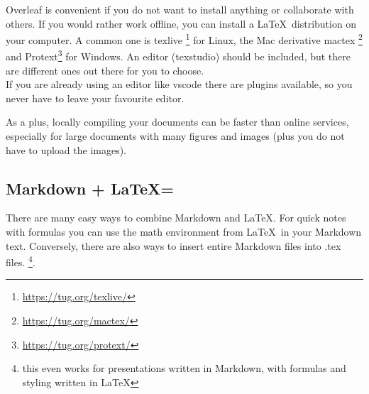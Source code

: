 Overleaf is convenient if you do not want to install anything or collaborate with others. If you would rather work offline, you can install a \LaTeX~distribution on your computer.
A common one is texlive \footnote{\url{https://tug.org/texlive/}} for Linux, the Mac derivative mactex \footnote{\url{https://tug.org/mactex/}} and Protext\footnote{\url{https://tug.org/protext/}} for Windows. An editor (texstudio) should be included, but there are different ones out there for you to choose.\\
If you are already using an editor like vscode there are plugins available, so you never have to leave your favourite editor.

As a plus, locally compiling your documents can be faster than online services, especially for large documents with many figures and images (plus you do not have to upload the images).

\subsection{Markdown + \texorpdfstring{\LaTeX = \heart}{Latex = <3}}

There are many easy ways to combine Markdown and \LaTeX. For quick notes with formulas you can use the math environment from \LaTeX~in your Markdown text.
Conversely, there are also ways to insert entire Markdown files into .tex files.
\footnote{this even works for presentations written in Markdown, with formulas and styling written in \LaTeX}.